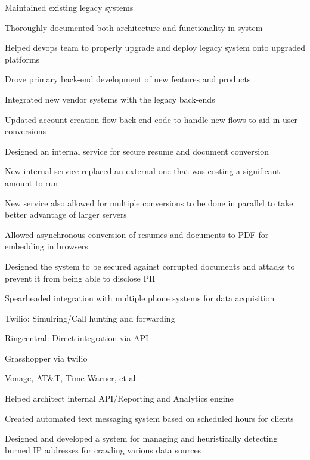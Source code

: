\documentclass[table,tmargin=1in,bmargin=1in,letterpaper]{resume}
\begin{document}
\begin{compactitem}
\item Maintained existing legacy systems
  \begin{compactitem}
  \item Thoroughly documented both architecture and functionality in system
  \item Helped devops team to properly upgrade and deploy legacy system onto upgraded platforms
  \end{compactitem}
\item Drove primary back-end development of new features and products
\item Integrated new vendor systems with the legacy back-ends
\end{compactitem}

\begin{compactitem}
\item Updated account creation flow back-end code to handle new flows to aid in user conversions
\item Designed an internal service for secure resume and document conversion
  \begin{compactitem}
  \item New internal service replaced an external one that was costing a significant amount to run
  \item New service also allowed for multiple conversions to be done in parallel to take better advantage of larger servers
  \item Allowed asynchronous conversion of resumes and documents to PDF for embedding in browsers
  \item Designed the system to be secured against corrupted documents and attacks to prevent it from being able to disclose PII
  \end{compactitem}
\end{compactitem}

\begin{compactitem}
\item Spearheaded integration with multiple phone systems for data acquisition
  \begin{compactitem}
  \item Twilio: Simulring/Call hunting and forwarding
  \item Ringcentral: Direct integration via API
  \item Grasshopper via twilio
  \item Vonage, AT\&T, Time Warner, et al.
  \end{compactitem}
\item Helped architect internal API/Reporting and Analytics engine
\item Created automated text messaging system based on scheduled hours for clients
\item Designed and developed a system for managing and heuristically detecting burned IP addresses for crawling various data sources 
\end{compactitem}
\end{document}
